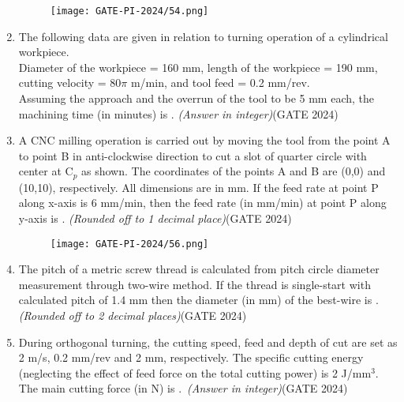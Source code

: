 \documentclass[journal,12pt,onecolumn]{IEEEtran}
\theoremstyle{remark}
\begin{document}
\begin{enumerate}
\begin{figure}[H]
    \centering
    \texttt{[image: GATE-PI-2024/54.png]} 
    \caption{}
    \label{fig:sandmoldsprue}
\end{figure}
\vspace{1cm}

\item The following data are given in relation to turning operation of a cylindrical workpiece.\\
Diameter of the workpiece = 160 mm, length of the workpiece = 190 mm, cutting velocity = 80$\pi$ m/min, and tool feed = 0.2 mm/rev.\\
Assuming the approach and the overrun of the tool to be 5 mm each, the machining time (in minutes) is \underline{\hspace{2cm}}. \textit{(Answer in integer)}\hfill{(GATE 2024)}
\vspace{1cm}

\item A CNC milling operation is carried out by moving the tool from the point A to point B in anti-clockwise direction to cut a slot of quarter circle with center at C$_p$ as shown. The coordinates of the points A and B are (0,0) and (10,10), respectively. All dimensions are in mm. If the feed rate at point P along x-axis is 6 mm/min, then the feed rate (in mm/min) at point P along y-axis is \underline{\hspace{2cm}}. \textit{(Rounded off to 1 decimal place)}\hfill{(GATE 2024)}

\begin{figure}[H]
    \centering
    \texttt{[image: GATE-PI-2024/56.png]}
    \caption{}
    \label{56}
\end{figure}
\vspace{1cm}
\newpage
\item The pitch of a metric screw thread is calculated from pitch circle diameter measurement through two-wire method. If the thread is single-start with calculated pitch of 1.4 mm then the diameter (in mm) of the best-wire is \underline{\hspace{2cm}}. \textit{(Rounded off to 2 decimal places)}\hfill{(GATE 2024)}
\vspace{1cm}


\item During orthogonal turning, the cutting speed, feed and depth of cut are set as 2 m/s, 0.2 mm/rev and 2 mm, respectively. The specific cutting energy (neglecting the effect of feed force on the total cutting power) is 2 J/mm$^3$. The main cutting force (in N) is \underline{\hspace{2cm}}.\ \textit{(Answer in integer)}\hfill{(GATE 2024)}
\vspace{1cm}


\end{enumerate}
\end{document}
